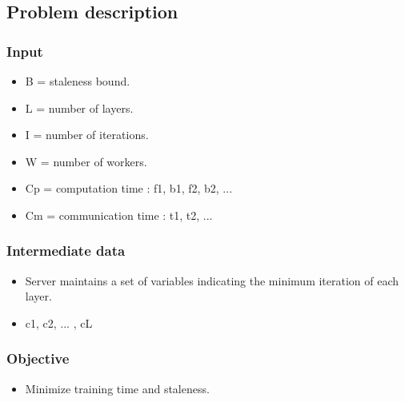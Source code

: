 \subsection{Problem description}
\begin{frame}
	\frametitle{Input}
	\begin{itemize}
		\item B = staleness bound.
		\item L = number of layers.
		\item I = number of iterations.
		\item W = number of workers.
		\item Cp = computation time : f1, b1, f2, b2, ...
		\item Cm = communication time : t1, t2, ...
	\end{itemize}
\end{frame}
\begin{frame}
	\frametitle{Intermediate data}
	\begin{itemize}
		\item Server maintains a set of variables indicating the minimum iteration of each layer.
		\item c1, c2, ... , cL
	\end{itemize}
\end{frame}

\begin{frame}
	\frametitle{Objective}
	\begin{itemize}
		\item Minimize training time and staleness. 
	\end{itemize}
\end{frame}


